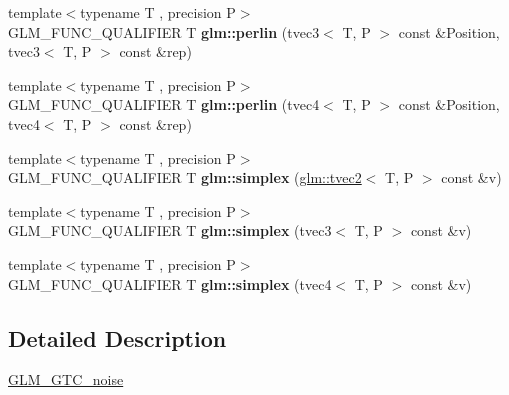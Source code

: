 \begin{DoxyCompactItemize}
\mbox{\label{noise_8inl_add9522a1426ca2f1499daf7603500269}} 
{\footnotesize template$<$typename T , precision P$>$ }\\G\+L\+M\+\_\+\+F\+U\+N\+C\+\_\+\+Q\+U\+A\+L\+I\+F\+I\+ER T {\bfseries glm\+::perlin} (tvec3$<$ T, P $>$ const \&Position, tvec3$<$ T, P $>$ const \&rep)
\item 
\mbox{\label{noise_8inl_aac7a6a7b23c4852eb1024f5b9564142f}} 
{\footnotesize template$<$typename T , precision P$>$ }\\G\+L\+M\+\_\+\+F\+U\+N\+C\+\_\+\+Q\+U\+A\+L\+I\+F\+I\+ER T {\bfseries glm\+::perlin} (tvec4$<$ T, P $>$ const \&Position, tvec4$<$ T, P $>$ const \&rep)
\item 
\mbox{\label{noise_8inl_afdd43ecc519f98c7550e8850c030f1a8}} 
{\footnotesize template$<$typename T , precision P$>$ }\\G\+L\+M\+\_\+\+F\+U\+N\+C\+\_\+\+Q\+U\+A\+L\+I\+F\+I\+ER T {\bfseries glm\+::simplex} (\hyperlink{structglm_1_1tvec2}{glm\+::tvec2}$<$ T, P $>$ const \&v)
\item 
\mbox{\label{noise_8inl_ad251ced23dfd0c991b7e06b5a398dfe5}} 
{\footnotesize template$<$typename T , precision P$>$ }\\G\+L\+M\+\_\+\+F\+U\+N\+C\+\_\+\+Q\+U\+A\+L\+I\+F\+I\+ER T {\bfseries glm\+::simplex} (tvec3$<$ T, P $>$ const \&v)
\item 
\mbox{\label{noise_8inl_a302e8f4466cd88ebd9581e67c8368254}} 
{\footnotesize template$<$typename T , precision P$>$ }\\G\+L\+M\+\_\+\+F\+U\+N\+C\+\_\+\+Q\+U\+A\+L\+I\+F\+I\+ER T {\bfseries glm\+::simplex} (tvec4$<$ T, P $>$ const \&v)
\end{DoxyCompactItemize}


\subsection{Detailed Description}
\hyperlink{group__gtc__noise}{G\+L\+M\+\_\+\+G\+T\+C\+\_\+noise} 